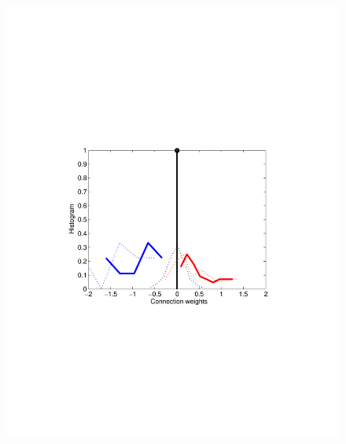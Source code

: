 \begin{figure}[h]
\begin{minipage}[c]{0.3\hsize}
\includegraphics[width=\hsize]{../figs/FigureA3_hist_iid}
\end{minipage}
\begin{minipage}[c]{0.3\hsize}

\end{minipage}
\end{figure}
